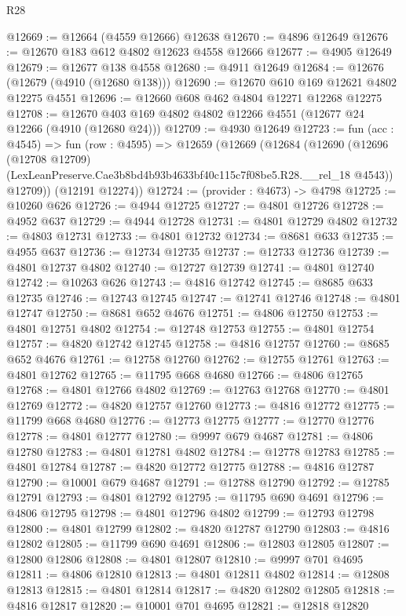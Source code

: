 \begin{lexlean}{R28}
\begin{coremodule}
@12669 := @12664 (@4559 @12666) @12638
@12670 := @4896 @12649
@12676 := @12670 @183 @612 @4802 @12623 @4558 @12666
@12677 := @4905 @12649
@12679 := @12677 @138 @4558
@12680 := @4911 @12649
@12684 := @12676 (@12679 (@4910 (@12680 @138)))
@12690 := @12670 @610 @169 @12621 @4802 @12275 @4551
@12696 := @12660 @608 @462 @4804 @12271 @12268 @12275
@12708 := @12670 @403 @169 @4802 @4802 @12266 @4551 (@12677 @24 @12266 (@4910 (@12680 @24)))
@12709 := @4930 @12649
@12723 := fun (acc : @4545) =>
  fun (row : @4595) =>
  @12659
    (@12669
      (@12684
        (@12690
          (@12696
            (@12708 @12709)
            (LexLeanPreserve.Cae3b8bd4b93b4633bf40c115c7f08be5.R28.__rel_18 @4543))
          @12709))
      (@12191 @12274))
@12724 := (provider : @4673) -> @4798
@12725 := @10260 @626
@12726 := @4944 @12725
@12727 := @4801 @12726
@12728 := @4952 @637
@12729 := @4944 @12728
@12731 := @4801 @12729 @4802
@12732 := @4803 @12731
@12733 := @4801 @12732
@12734 := @8681 @633
@12735 := @4955 @637
@12736 := @12734 @12735
@12737 := @12733 @12736
@12739 := @4801 @12737 @4802
@12740 := @12727 @12739
@12741 := @4801 @12740
@12742 := @10263 @626
@12743 := @4816 @12742
@12745 := @8685 @633 @12735
@12746 := @12743 @12745
@12747 := @12741 @12746
@12748 := @4801 @12747
@12750 := @8681 @652 @4676
@12751 := @4806 @12750
@12753 := @4801 @12751 @4802
@12754 := @12748 @12753
@12755 := @4801 @12754
@12757 := @4820 @12742 @12745
@12758 := @4816 @12757
@12760 := @8685 @652 @4676
@12761 := @12758 @12760
@12762 := @12755 @12761
@12763 := @4801 @12762
@12765 := @11795 @668 @4680
@12766 := @4806 @12765
@12768 := @4801 @12766 @4802
@12769 := @12763 @12768
@12770 := @4801 @12769
@12772 := @4820 @12757 @12760
@12773 := @4816 @12772
@12775 := @11799 @668 @4680
@12776 := @12773 @12775
@12777 := @12770 @12776
@12778 := @4801 @12777
@12780 := @9997 @679 @4687
@12781 := @4806 @12780
@12783 := @4801 @12781 @4802
@12784 := @12778 @12783
@12785 := @4801 @12784
@12787 := @4820 @12772 @12775
@12788 := @4816 @12787
@12790 := @10001 @679 @4687
@12791 := @12788 @12790
@12792 := @12785 @12791
@12793 := @4801 @12792
@12795 := @11795 @690 @4691
@12796 := @4806 @12795
@12798 := @4801 @12796 @4802
@12799 := @12793 @12798
@12800 := @4801 @12799
@12802 := @4820 @12787 @12790
@12803 := @4816 @12802
@12805 := @11799 @690 @4691
@12806 := @12803 @12805
@12807 := @12800 @12806
@12808 := @4801 @12807
@12810 := @9997 @701 @4695
@12811 := @4806 @12810
@12813 := @4801 @12811 @4802
@12814 := @12808 @12813
@12815 := @4801 @12814
@12817 := @4820 @12802 @12805
@12818 := @4816 @12817
@12820 := @10001 @701 @4695
@12821 := @12818 @12820

\end{coremodule}
\end{lexlean}
